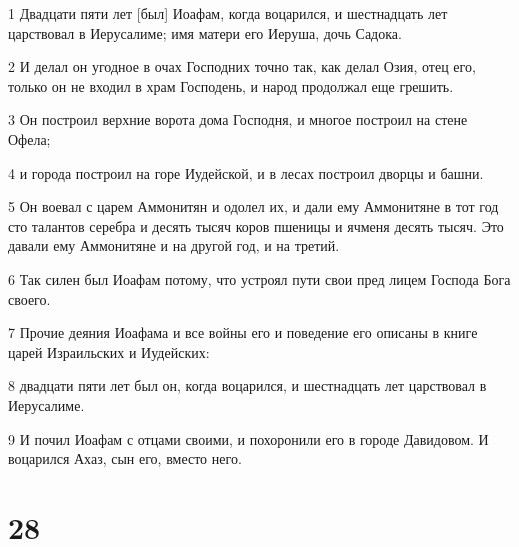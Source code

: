 \par 1 Двадцати пяти лет [был] Иоафам, когда воцарился, и шестнадцать лет царствовал в Иерусалиме; имя матери его Иеруша, дочь Садока.
\par 2 И делал он угодное в очах Господних точно так, как делал Озия, отец его, только он не входил в храм Господень, и народ продолжал еще грешить.
\par 3 Он построил верхние ворота дома Господня, и многое построил на стене Офела;
\par 4 и города построил на горе Иудейской, и в лесах построил дворцы и башни.
\par 5 Он воевал с царем Аммонитян и одолел их, и дали ему Аммонитяне в тот год сто талантов серебра и десять тысяч коров пшеницы и ячменя десять тысяч. Это давали ему Аммонитяне и на другой год, и на третий.
\par 6 Так силен был Иоафам потому, что устроял пути свои пред лицем Господа Бога своего.
\par 7 Прочие деяния Иоафама и все войны его и поведение его описаны в книге царей Израильских и Иудейских:
\par 8 двадцати пяти лет был он, когда воцарился, и шестнадцать лет царствовал в Иерусалиме.
\par 9 И почил Иоафам с отцами своими, и похоронили его в городе Давидовом. И воцарился Ахаз, сын его, вместо него.

\chapter{28}

